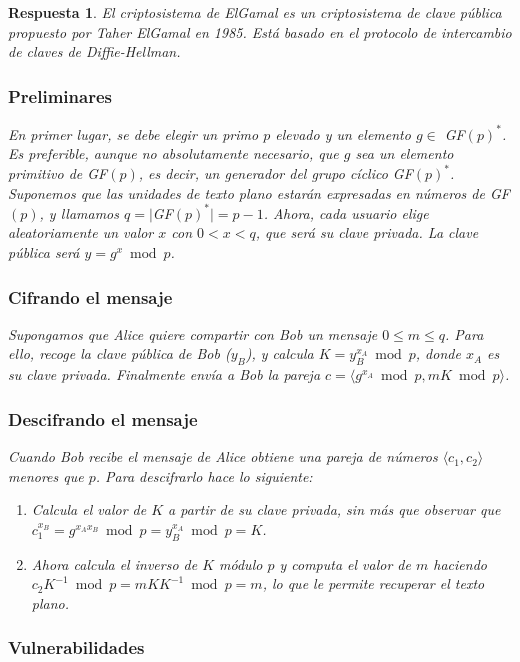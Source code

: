 \documentclass[
  a4paper,
  spanish,
  12pt,
]{scrartcl}
\theoremstyle{ejercicio-style}
\theoremstyle{remark-style}
\newtheorem*{sol}{Respuesta}
\theoremstyle{teorema-style}
\begin{document}
\begin{sol}
El criptosistema de ElGamal es un criptosistema de clave pública propuesto por Taher ElGamal en 1985. Está basado en el protocolo de intercambio de claves de Diffie-Hellman.

\subsubsection*{Preliminares}

En primer lugar, se debe elegir un primo $p$ elevado y un elemento  $g \in$ GF$(p)^\ast$. Es preferible, aunque no absolutamente necesario, que $g$ sea un elemento primitivo de GF$(p)$, es decir, un generador del grupo cíclico GF$(p)^\ast$. Suponemos que las unidades de texto plano estarán expresadas en números de GF$(p)$, y llamamos $q = |$GF$(p)^\ast| = p -1$. Ahora, cada usuario elige aleatoriamente un valor $x$ con $0 < x < q$, que será su clave privada. La clave pública será $y = g^x \bmod p$.

\subsubsection*{Cifrando el mensaje}

Supongamos que Alice quiere compartir con Bob un mensaje \(0\leq m \leq q\). Para ello, recoge la clave pública de Bob ($y_B$), y calcula $K = y_B ^{x_A} \bmod p$, donde $x_A$ es su clave privada. Finalmente envía a Bob la pareja \(c = \langle g^{x_{A}} \bmod{p}, mK \bmod p\rangle\).

\subsubsection*{Descifrando el mensaje}

Cuando Bob recibe el mensaje de Alice obtiene una pareja de números $\langle c_1, c_2 \rangle$ menores que $p$. Para descifrarlo hace lo siguiente:

\begin{enumerate}
  \item Calcula el valor de $K$ a partir de su clave privada, sin más que observar que $c_1^{x_B} = g^{x_Ax_B} \bmod p = y_B^{x_A} \bmod p = K$.
  \item Ahora calcula el inverso de $K$ módulo $p$ y computa el valor de $m$ haciendo $c_2K^{-1} \bmod p = mKK^{-1} \bmod p = m$, lo que le permite recuperar el texto plano.
\end{enumerate}

\subsubsection*{Vulnerabilidades}


\end{sol}
\end{document}
